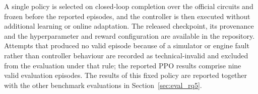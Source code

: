 A single policy is selected on closed-loop completion over the official circuits
and frozen before the reported episodes, and the controller is then executed
without additional learning or online adaptation. The released checkpoint, its
provenance and the hyperparameter and reward configuration are available in the
repository. Attempts that produced no valid episode because of a simulator or
engine fault rather than controller behaviour are recorded as technical-invalid
and excluded from the evaluation under that rule; the reported PPO results
comprise nine valid evaluation episodes. The results of this fixed policy are
reported together with the other benchmark evaluations in
Section~\ref{sec:eval_rq5}.
